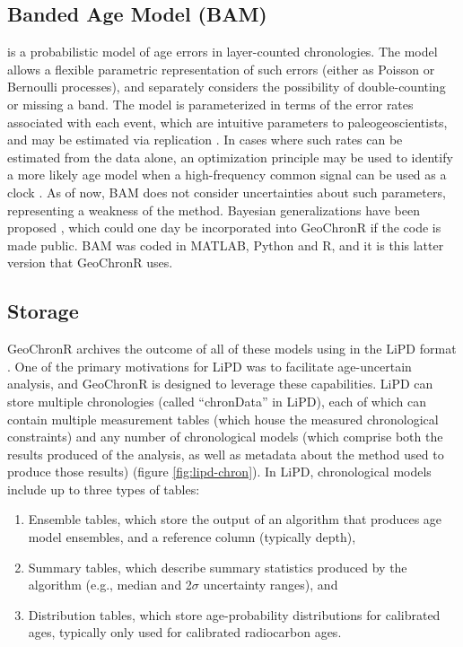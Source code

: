 \documentclass[gchron, manuscript]{copernicus}
\begin{document}
\subsection{Banded Age Model (BAM)}

\citet{BAM} is a probabilistic model of age errors in layer-counted chronologies.
The model allows a flexible parametric representation of such errors (either as Poisson or Bernoulli processes), and separately considers the possibility of double-counting or missing a band.
The model is parameterized in terms of the error rates associated with each event, which are intuitive parameters to paleogeoscientists, and may be estimated via replication \citep{DeLong_Paleo3_2013}.
In cases where such rates can be estimated from the data alone, an optimization principle may be used to identify a more likely age model when a high-frequency common signal can be used as a clock \citep{BAM}.
As of now, BAM does not consider uncertainties about such parameters, representing a weakness of the method.
Bayesian generalizations have been proposed \citep{BoersCP2017}, which could one day be incorporated into GeoChronR if the code is made public.
BAM was coded in MATLAB, Python and R, and it is this latter version that GeoChronR uses.

\subsection{Storage}

GeoChronR archives the outcome of all of these models using in the LiPD format \citep{lipd_cp}.
One of the primary motivations for LiPD was to facilitate age-uncertain analysis, and GeoChronR is designed to leverage these capabilities.
LiPD can store multiple chronologies (called ``chronData'' in LiPD), each of which can contain multiple measurement tables (which house the measured chronological constraints) and any number of chronological models (which comprise both the results produced of the analysis, as well as metadata about the method used to produce those results) (figure \ref{fig:lipd-chron}).
In LiPD, chronological models include up to three types of tables:

\begin{enumerate}
\def\labelenumi{\arabic{enumi}.}
\item
  Ensemble tables, which store the output of an algorithm that produces age model ensembles, and a reference column (typically depth),
\item
  Summary tables, which describe summary statistics produced by the algorithm (e.g., median and 2\(\sigma\) uncertainty ranges), and
\item
  Distribution tables, which store age-probability distributions for calibrated ages, typically only used for calibrated radiocarbon ages.
\end{enumerate}
\end{document}
